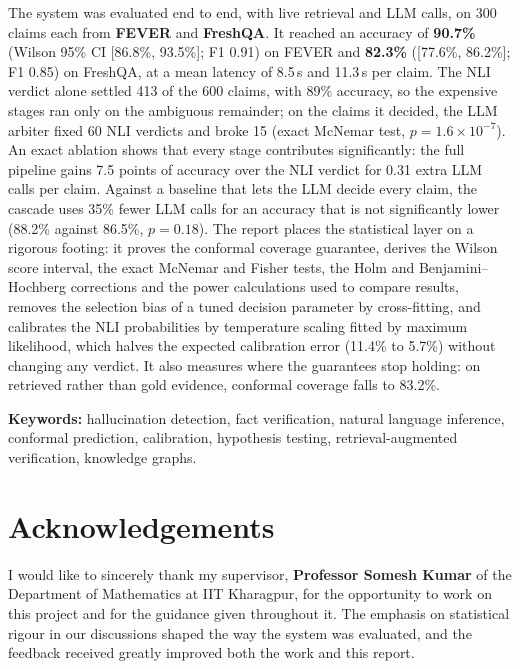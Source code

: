\documentclass[12pt,a4paper,oneside]{report}
\newcommand{\Supervisor}{Professor Somesh Kumar}
\newcommand{\SupervisorDept}{Department of Mathematics}
\theoremstyle{plain}
\theoremstyle{definition}
\theoremstyle{remark}
\begin{document}
The system was evaluated end to end, with live retrieval and LLM calls, on 300 claims each from \textbf{FEVER} and \textbf{FreshQA}. It reached an accuracy of \textbf{90.7\%} (Wilson 95\% CI [86.8\%, 93.5\%]; F1 0.91) on FEVER and \textbf{82.3\%} ([77.6\%, 86.2\%]; F1 0.85) on FreshQA, at a mean latency of 8.5\,s and 11.3\,s per claim. The NLI verdict alone settled 413 of the 600 claims, with 89\% accuracy, so the expensive stages ran only on the ambiguous remainder; on the claims it decided, the LLM arbiter fixed 60 NLI verdicts and broke 15 (exact McNemar test, $p = 1.6 \times 10^{-7}$). An exact ablation shows that every stage contributes significantly: the full pipeline gains 7.5 points of accuracy over the NLI verdict for 0.31 extra LLM calls per claim. Against a baseline that lets the LLM decide every claim, the cascade uses 35\% fewer LLM calls for an accuracy that is not significantly lower (88.2\% against 86.5\%, $p = 0.18$). The report places the statistical layer on a rigorous footing: it proves the conformal coverage guarantee, derives the Wilson score interval, the exact McNemar and Fisher tests, the Holm and Benjamini--Hochberg corrections and the power calculations used to compare results, removes the selection bias of a tuned decision parameter by cross-fitting, and calibrates the NLI probabilities by temperature scaling fitted by maximum likelihood, which halves the expected calibration error (11.4\% to 5.7\%) without changing any verdict. It also measures where the guarantees stop holding: on retrieved rather than gold evidence, conformal coverage falls to 83.2\%.

\vspace{0.5em}
\noindent\textbf{Keywords:} hallucination detection, fact verification, natural language inference, conformal prediction, calibration, hypothesis testing, retrieval-augmented verification, knowledge graphs.

\chapter*{Acknowledgements}
\thispagestyle{plain}
I would like to sincerely thank my supervisor, \textbf{\Supervisor} of the \SupervisorDept{} at IIT Kharagpur, for the opportunity to work on this project and for the guidance given throughout it. The emphasis on statistical rigour in our discussions shaped the way the system was evaluated, and the feedback received greatly improved both the work and this report.
\end{document}
